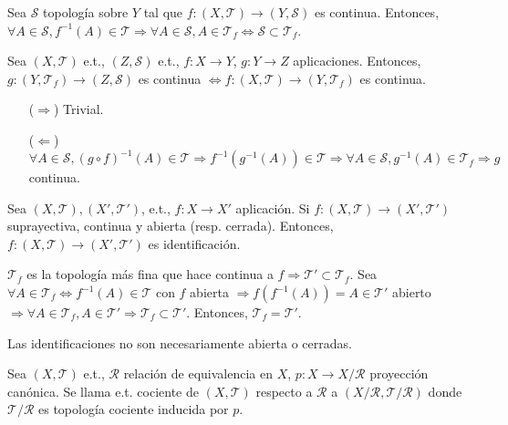 \begin{dem}
  Sea $\mathcal{S}$ topología sobre $Y$ tal que $f: ( X, \mathcal{T} ) \to ( Y, \mathcal{S} )$ es continua. Entonces, $\forall A \in \mathcal{S}, f^{-1}(A) \in \mathcal{T} \Rightarrow \forall A \in \mathcal{S}, A \in \mathcal{T}_{f} \Leftrightarrow \mathcal{S} \subset \mathcal{T}_{f}$.
\end{dem}

\begin{prop}
  Sea $( X, \mathcal{T} )$ e.t., $( Z, \mathcal{S} )$ e.t., $f: X \to Y$, $g: Y \to Z$ aplicaciones. Entonces, $g: (Y, \mathcal{T}_{f}) \to (Z,\mathcal{S})$ es continua $\Leftrightarrow f: (X, \mathcal{T}) \to (Y, \mathcal{T}_{f})$ es continua.
\end{prop}
 
\begin{dem}
  \begin{enumerate}[label=(\roman*)]
    \item [($\Rightarrow$)] Trivial.
    \item [($\Leftarrow$)] $\forall A \in \mathcal{S}, (g \circ f)^{-1}(A) \in \mathcal{T} \Rightarrow f^{-1}(g^{-1}(A)) \in \mathcal{T} \Rightarrow \forall A \in \mathcal{S}, g^{-1}(A) \in \mathcal{T}_{f} \Rightarrow g$ continua.
  \end{enumerate} 
\end{dem}

\begin{prop}
  Sea $ ( X, \mathcal{T} ), ( X', \mathcal{T}' )$, e.t., $f: X \to X'$ aplicación. Si $f: ( X, \mathcal{T} ) \to ( X', \mathcal{T}' )$ suprayectiva, continua y abierta (resp. cerrada). Entonces, $f: ( X, \mathcal{T} ) \to ( X', \mathcal{T}' )$ es identificación.
\end{prop}

\begin{dem}
  $\mathcal{T}_{f}$ es la topología más fina que hace continua a $f \Rightarrow \mathcal{T}' \subset \mathcal{T}_{f}$. Sea $\forall A \in \mathcal{T}_{f} \Leftrightarrow f^{-1}(A) \in \mathcal{T}$ con $ f$ abierta $\Rightarrow f(f^{-1}(A)) = A \in \mathcal{T}'$ abierto $\Rightarrow \forall A \in \mathcal{T}_{f}, A \in \mathcal{T}' \Rightarrow \mathcal{T}_{f} \subset \mathcal{T}'$. Entonces, $\mathcal{T}_{f} = \mathcal{T}'$.
\end{dem}

\begin{obs}
  Las identificaciones no son necesariamente abierta o cerradas.
\end{obs}

\begin{defn}
  Sea $ ( X, \mathcal{T} )$ e.t., $\mathcal{R}$ relación de equivalencia en $X$, $p: X \to X / \mathcal{R}$ proyección canónica. Se llama e.t. cociente de $ ( X, \mathcal{T} )$ respecto a $ \mathcal{R}$ a $( X / \mathcal{R}, \mathcal{T} / \mathcal{R} )$ donde $\mathcal{T} / \mathcal{R}$ es topología cociente inducida por $p$.
\end{defn}
